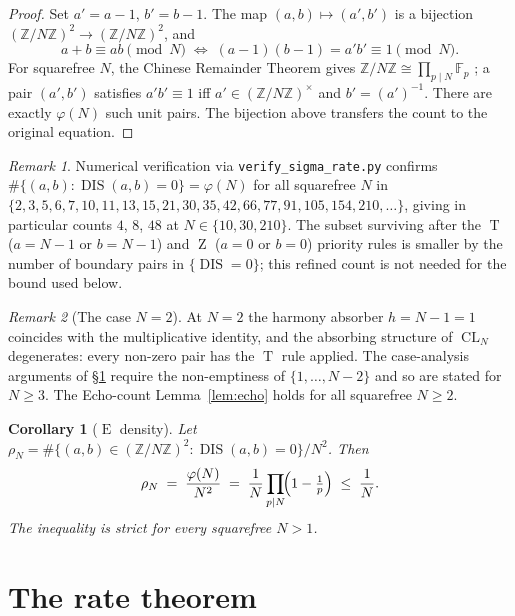 \documentclass[11pt,reqno]{amsart}
\theoremstyle{plain}
\newtheorem{corollary}[theorem]{Corollary}
\theoremstyle{definition}
\theoremstyle{remark}
\newtheorem*{remark}{Remark}
\DeclareMathOperator{\DIS}{DIS}
\DeclareMathOperator{\CL}{CL}
\DeclareMathOperator{\ECHO}{E}
\DeclareMathOperator{\HARM}{T}
\DeclareMathOperator{\VOID}{Z}
\newcommand{\ZN}{\mathbb{Z}/N\mathbb{Z}}
\begin{document}
\begin{proof}
Set $a'=a-1$, $b'=b-1$. The map $(a,b)\mapsto(a',b')$ is a bijection
$(\ZN)^{2}\to(\ZN)^{2}$, and
\[
  a+b\equiv ab\pmod N
  \;\Longleftrightarrow\;
  (a-1)(b-1)=a'b'\equiv 1\pmod N.
\]
For squarefree $N$, the Chinese Remainder Theorem gives
$\ZN\cong\prod_{p\mid N}\mathbb F_{p}$ \cite{Gauss1801,Lang2002};
a pair $(a',b')$ satisfies $a'b'\equiv 1$ iff $a'\in(\ZN)^{\times}$
and $b'=(a')^{-1}$. There are exactly $\varphi(N)$ such unit pairs.
The bijection above transfers the count to the original equation.
\end{proof}

\begin{remark}
Numerical verification via \texttt{verify\_sigma\_rate.py} confirms
$\#\{(a,b):\DIS(a,b)=0\}=\varphi(N)$ for all squarefree $N$ in
$\{2,3,5,6,7,10,11,13,15,21,30,35,42,66,77,91,105,154,210,\dots\}$,
giving in particular counts $4$, $8$, $48$ at $N\in\{10,30,210\}$.
The subset surviving after the $\HARM$ ($a=N-1$ or $b=N-1$) and
$\VOID$ ($a=0$ or $b=0$) priority rules is smaller by the number of
boundary pairs in $\{\DIS=0\}$; this refined count is not needed for
the bound used below.
\end{remark}

\begin{remark}[The case $N=2$]\label{rem:Nis2}
At $N=2$ the harmony absorber $h=N-1=1$ coincides with the
multiplicative identity, and the absorbing structure of $\CL_N$
degenerates: every non-zero pair has the $\HARM$ rule applied. The
case-analysis arguments of \S\ref{sec:rate} require the
non-emptiness of $\{1,\dots,N-2\}$ and so are stated for $N\ge 3$.
The Echo-count Lemma~\ref{lem:echo} holds for all squarefree $N\ge 2$.
\end{remark}

\begin{corollary}[$\ECHO$ density]\label{cor:echo-density}
Let $\rho_N=\#\{(a,b)\in(\ZN)^{2}:\DIS(a,b)=0\}/N^{2}$. Then
\begin{equation}\label{eq:rho}
  \rho_N\;=\;\frac{\varphi(N)}{N^{2}}
  \;=\;\frac{1}{N}\prod_{p\mid N}\!\Bigl(1-\tfrac{1}{p}\Bigr)
  \;\le\;\frac{1}{N}.
\end{equation}
The inequality is strict for every squarefree $N>1$.
\end{corollary}

\section{The rate theorem}\label{sec:rate}
\end{document}
